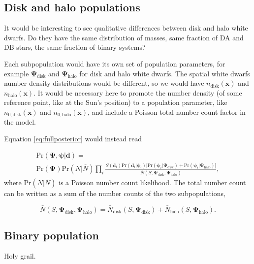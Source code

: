 \documentclass[fleqn,usenatbib]{mnras}
\newcommand{\popp}{\boldsymbol{\Psi}}
\newcommand{\objp}{\boldsymbol{\psi}}
\newcommand{\data}{\mathbf{d}}
\newcommand{\pr}{\text{Pr}}
\begin{document}
\subsection{Disk and halo populations}

It would be interesting to see qualitative differences between disk and halo white dwarfs. Do they have the same distribution of masses, same fraction of DA and DB stars, the same fraction of binary systems?

Each subpopulation would have its own set of population parameters, for example $\popp_\text{disk}$ and $\popp_\text{halo}$ for disk and halo white dwarfs. The spatial white dwarfs number density distributions would be different, so we would have $n_\text{disk}(\mathbf{x})$ and $n_\text{halo}(\mathbf{x})$. It would be necessary here to promote the number density (of some reference point, like at the Sun's position) to a population parameter, like $n_{0,\text{disk}}(\mathbf{x})$ and $n_{0,\text{halo}}(\mathbf{x})$, and include a Poisson total number count factor in the model.

Equation \eqref{eq:fullposterior} would instead read

\begin{equation}\label{eq:posterior_disk_halo}
\begin{split}
	\pr(\popp,\objp | \data ) = \\ \pr(\popp) \pr(N | \bar{N}) 
	\prod_i \frac{S(\data_i) \pr(\data_i | \objp_i) \Big[ \pr(\objp_i | \popp_\text{disk})+\pr(\objp_i | \popp_\text{halo}) \Big]}{\bar{N}(S,\popp_\text{disk},\popp_\text{halo})},
\end{split}
\end{equation}
where $\pr(N | \bar{N})$ is a Poisson number count likelihood. The total number count can be written as a sum of the number counts of the two subpopulations,

\begin{equation}
	\bar{N}(S,\popp_\text{disk},\popp_\text{halo})=\bar{N}_\text{disk}(S,\popp_\text{disk})+\bar{N}_\text{halo}(S,\popp_\text{halo}).
\end{equation}







\subsection{Binary population}

Holy grail.
\end{document}
